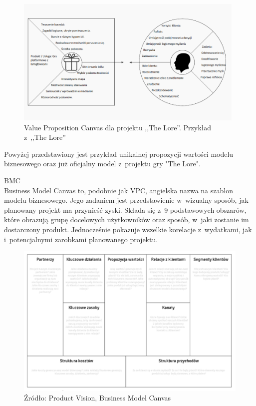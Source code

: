\documentclass[oneside,polski,logo]{amuthesis}
\begin{document}
\begin{figure}[h]
	\centering
	\includegraphics[width=11cm]{images/hyps/VPC-The Lore.png}
	\caption{Value Proposition Canvas dla projektu ,,The Lore''. Przykład z~,,The Lore''}
\end{figure}

Powyżej przedstawiony jest przykład unikalnej propozycji wartości modelu biznesowego oraz już oficjalny model z~projektu gry "The Lore".

BMC\\
Business Model Canvas to, podobnie jak VPC, angielska nazwa na szablon modelu biznesowego. Jego zadaniem jest przedstawienie w~wizualny sposób, jak planowany projekt ma przynieść zyski. Składa się z~9 podstawowych obszarów, które obrazują grupę docelowych użytkowników oraz sposób, w~jaki zostanie im dostarczony produkt. Jednocześnie pokazuje wszelkie korelacje z~wydatkami, jak i~potencjalnymi zarobkami planowanego projektu. \cite{BMC}

\begin{figure}[h]
	\centering
	\includegraphics[width=15cm]{images/hyps/BMC.png}
	\caption{Źródło: Product Vision, Business Model Canvas}
\end{figure}
\end{document}
